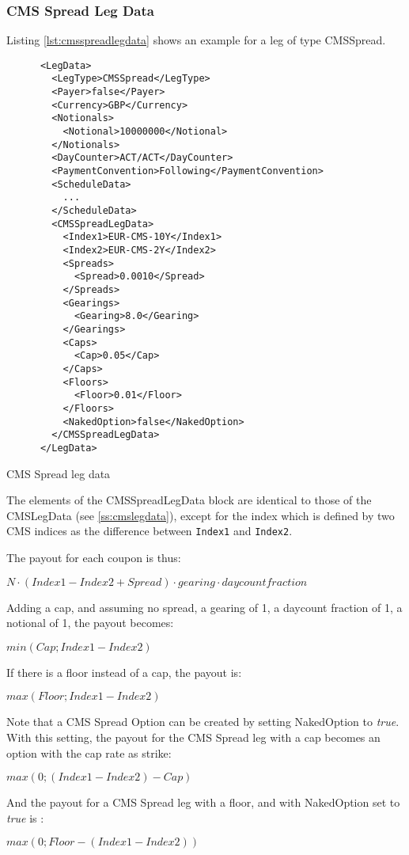 \subsubsection{CMS Spread Leg Data}
\label{ss:cmsspreadlegdata}

Listing \ref{lst:cmsspreadlegdata} shows an example for a leg of type CMSSpread.

\begin{listing}[H]
\begin{verbatim}
      <LegData>
        <LegType>CMSSpread</LegType>
        <Payer>false</Payer>
        <Currency>GBP</Currency>
        <Notionals>
          <Notional>10000000</Notional>
        </Notionals>
        <DayCounter>ACT/ACT</DayCounter>
        <PaymentConvention>Following</PaymentConvention>
        <ScheduleData>
          ...
        </ScheduleData>
        <CMSSpreadLegData>
          <Index1>EUR-CMS-10Y</Index1>
          <Index2>EUR-CMS-2Y</Index2>
          <Spreads>
            <Spread>0.0010</Spread>
          </Spreads>
          <Gearings>
            <Gearing>8.0</Gearing>
          </Gearings>
          <Caps>
            <Cap>0.05</Cap>
          </Caps>
          <Floors>
            <Floor>0.01</Floor>
          </Floors>
          <NakedOption>false</NakedOption>  
        </CMSSpreadLegData>
      </LegData>
\end{verbatim}
\caption{CMS Spread leg data}
\label{lst:cmsspreadlegdata}
\end{listing}

The elements of the CMSSpreadLegData block are identical to those of the CMSLegData (see \ref{ss:cmslegdata}), except
for the index which is defined by two CMS indices as the difference between \verb+Index1+ and \verb+Index2+.

The payout for each coupon is thus:

$
N \cdot (Index1 - Index2 + Spread) \cdot gearing \cdot daycountfraction
$

Adding a cap, and assuming no spread,  a gearing of 1, a daycount fraction of 1, a notional of 1, the payout becomes:

$
min (Cap; Index1 - Index2) 
$

If there is a floor instead of a cap, the payout is:

$
max (Floor; Index1 - Index2) 
$

Note that a CMS Spread Option can be created by setting NakedOption to \emph{true}. With this setting, the payout for the CMS Spread leg with a cap becomes an option with the cap rate as strike:

$
max (0; (Index1 - Index2) - Cap) 
$

And the payout for a CMS Spread leg with a floor, and with NakedOption set to \emph{true} is :

$
max (0; Floor - (Index1 - Index2))
$
